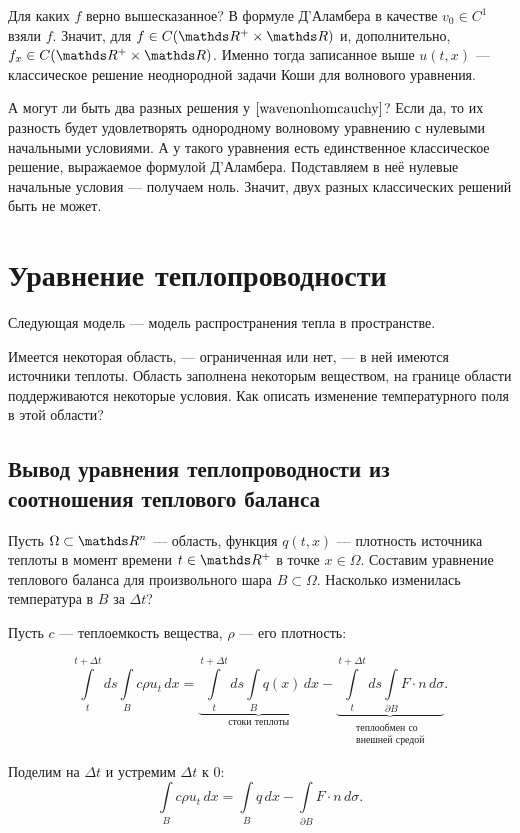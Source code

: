 Для каких $f$ верно вышесказанное? В формуле Д'Аламбера в качестве $v_0 \in C^1$ взяли $f$. Значит, для $f \in C(\real^+ \times \real)$ и, дополнительно, $f_x \in C(\real^+ \times \real)$. Именно тогда записанное выше $u(t,x)$ --- классическое решение неоднородной задачи Коши для волнового уравнения.

А могут ли быть два разных решения у $\eqref{wavenonhomcauchy}$? Если да, то их разность будет удовлетворять однородному волновому уравнению с нулевыми начальными условиями. А у такого уравнения есть единственное классическое решение, выражаемое формулой Д'Аламбера. Подставляем в неё нулевые начальные условия --- получаем ноль. Значит, двух разных классических решений быть не может.

\section{Уравнение теплопроводности}
Следующая модель --- модель распространения тепла в пространстве.

Имеется некоторая область, --- ограниченная или нет, --- в ней имеются источники теплоты. Область заполнена некоторым веществом, на границе области поддерживаются некоторые условия. Как описать изменение температурного поля в этой области?

\subsection{Вывод уравнения теплопроводности из соотношения теплового баланса}

Пусть $\Omega \subset \real^n$ --- область, функция $q(t,x)$ --- плотность источника теплоты в момент времени $t \in \real^+$ в точке $x \in \Omega$. Составим уравнение теплового баланса для произвольного шара $B \subset \Omega$. Насколько изменилась температура в $B$ за $\Delta t$?

Пусть $c$ --- теплоемкость вещества, $\rho$ --- его плотность:

$$ \int \limits_t^{t +\Delta t} ds \int \limits_B  c \rho u_t \, dx = \underbrace {\int \limits_t^{t + \Delta t} ds \int \limits_B q(x) \, dx}_{\text{стоки теплоты}} - \underbrace {\int \limits_t^{t + \Delta t} ds \int \limits_{\partial B} F \cdot n \, d \sigma}_{\substack{\text{теплообмен со} \\ \text{внешней средой}}}.$$

Поделим на $\Delta t$ и устремим $\Delta t$ к $0$:
$$ \int \limits_B c \rho u_t \, dx = \int \limits_B q \, dx - \int \limits_{\partial B} F \cdot n \, d \sigma. $$

